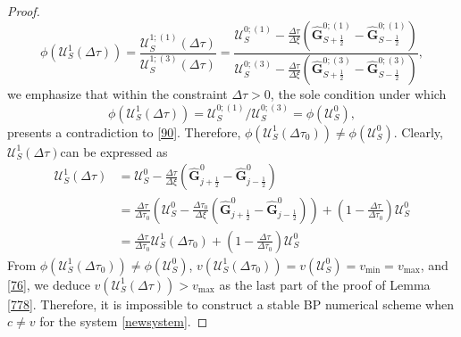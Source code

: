 \documentclass[10pt,a4paper]{amsart}
\begin{document}
\begin{proof}
	\begin{equation*}
		\phi \left( \boldsymbol{\mathcal{U}}_S^{1}(\Delta \tau) \right) = \frac{\boldsymbol{\mathcal{U}}_S^{1;(1)}(\Delta \tau)}{\boldsymbol{\mathcal{U}}_S^{1;(3)}(\Delta \tau)} = \frac{\boldsymbol{\mathcal{U}}_S^{0;(1)} - \frac{\Delta \tau}{\Delta \xi} \left( \widehat{\mathbf{G}}_{S + \frac{1}{2}}^{0;(1)} - \widehat{\mathbf{G}}_{S - \frac{1}{2}}^{0;(1)} \right)}{\boldsymbol{\mathcal{U}}_S^{0;(3)} - \frac{\Delta \tau}{\Delta \xi} \left( \widehat{\mathbf{G}}_{S + \frac{1}{2}}^{0;(3)} - \widehat{\mathbf{G}}_{S - \frac{1}{2}}^{0;(3)} \right)},
	\end{equation*}
	we emphasize that within the constraint $\Delta \tau > 0$, the sole condition under which 
	\begin{equation*}
		\phi \left( \boldsymbol{\mathcal{U}}_S^{1}(\Delta \tau) \right) = \boldsymbol{\mathcal{U}}_S^{0;(1)} / \boldsymbol{\mathcal{U}}_S^{0;(3)} = \phi \left( \boldsymbol{\mathcal{U}}_S^{0} \right),
	\end{equation*}
	presents a contradiction to \eqref{90}. Therefore, $\phi \left( \boldsymbol{\mathcal{U}}_S^{1}(\Delta \tau_0) \right) \neq \phi \left( \boldsymbol{\mathcal{U}}_S^{0} \right)$. Clearly, $\boldsymbol{\mathcal{U}}_S^{1}(\Delta \tau) $can be expressed as 
	\begin{equation}
	\label{76}
		\begin{aligned}
			\boldsymbol{\mathcal{U}}_S^{1}(\Delta \tau) 
			&= \boldsymbol{\mathcal{U}}_S^0 - \frac{\Delta \tau}{\Delta \xi} \left( \widehat{\mathbf{G}}_{j + \frac{1}{2}}^0 - \widehat{\mathbf{G}}_{j - \frac{1}{2}}^0 \right) \\
			&= \frac{\Delta \tau}{\Delta \tau_0} \left( \boldsymbol{\mathcal{U}}_S^0 - \frac{\Delta \tau_0}{\Delta \xi} \left( \widehat{\mathbf{G}}_{j + \frac{1}{2}}^0 - \widehat{\mathbf{G}}_{j - \frac{1}{2}}^0 \right)\right) 
			+ \left( 1 - \frac{\Delta \tau}{\Delta \tau_0}\right)\boldsymbol{\mathcal{U}}_S^0\\
			&=\frac{\Delta \tau}{\Delta \tau_0}\boldsymbol{\mathcal{U}}_S^{1}(\Delta \tau_0) + \left( 1 - \frac{\Delta \tau}{\Delta \tau_0}\right) \boldsymbol{\mathcal{U}}_S^{0}
		\end{aligned} 
	\end{equation}
	From $\phi \left( \boldsymbol{\mathcal{U}}_S^{1}(\Delta \tau_0) \right) \neq \phi \left( \boldsymbol{\mathcal{U}}_S^{0} \right)$, $v \left( \boldsymbol{\mathcal{U}}_S^{1}(\Delta \tau_0) \right) = v \left( \boldsymbol{\mathcal{U}}_S^{0} \right) = v_{\min} = v_{\max}$, and \eqref{76}, we deduce $v \left(\boldsymbol{\mathcal{U}}^1_S (\Delta \tau) \right) > v_{\max}$ as the last part of the proof of Lemma \ref{778}. Therefore, it is impossible to construct a stable BP numerical scheme when $c \neq v$ for the system \eqref{newsystem}.
\end{proof}
\end{document}
